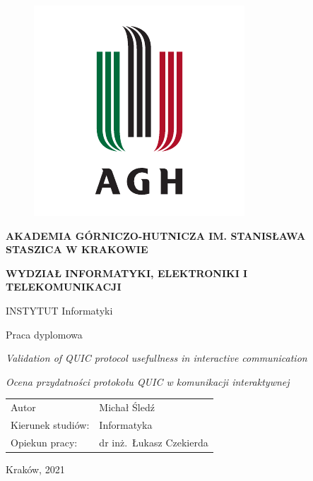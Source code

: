 \thispagestyle{empty}
{\selectfont
\begin{figure}[htbp]
    \centering
    \includegraphics[scale=1.5]{img/agh-logo.pdf}
\end{figure}

\centerline{\small\textbf{AKADEMIA GÓRNICZO-HUTNICZA IM. STANISŁAWA STASZICA W KRAKOWIE}}
\vspace{1em}
\centerline{\small\textbf{WYDZIAŁ INFORMATYKI, ELEKTRONIKI I TELEKOMUNIKACJI}}
\vspace{1em}
\centerline{\small INSTYTUT Informatyki}
\vspace{2em}
\centerline{\Large Praca dyplomowa}
\vspace{2em}
\centerline{\textit{\large Validation of QUIC protocol usefullness in interactive communication}}
\vspace{1em}
\centerline{\textit{\large Ocena przydatności protokołu QUIC w komunikacji interaktywnej}}
\vspace{3em}

\begin{table}[h]
    \begin{tabular}{l l}
        Autor             & Michał Śledź              \\
        Kierunek studiów: & Informatyka               \\
        Opiekun pracy:    & dr inż.\ Łukasz Czekierda \\
    \end{tabular}
\end{table}

\null
\vfill
\centerline{Kraków, 2021}
}